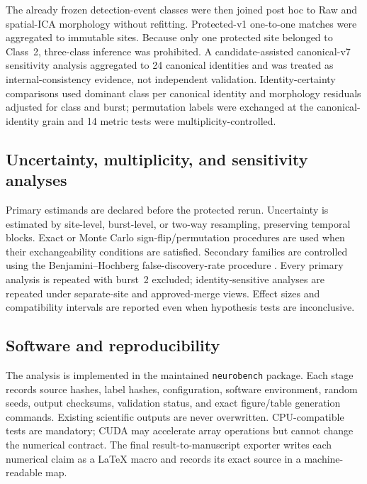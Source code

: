 The already frozen detection-event classes were then joined post hoc to Raw and spatial-ICA morphology without refitting. Protected-v1 one-to-one matches were aggregated to immutable sites. Because only one protected site belonged to Class~2, three-class inference was prohibited. A candidate-assisted canonical-v7 sensitivity analysis aggregated to 24 canonical identities and was treated as internal-consistency evidence, not independent validation. Identity-certainty comparisons used dominant class per canonical identity and morphology residuals adjusted for class and burst; permutation labels were exchanged at the canonical-identity grain and 14 metric tests were multiplicity-controlled.

\subsection{Uncertainty, multiplicity, and sensitivity analyses}

Primary estimands are declared before the protected rerun. Uncertainty is estimated by site-level, burst-level, or two-way resampling, preserving temporal blocks. Exact or Monte Carlo sign-flip/permutation procedures are used when their exchangeability conditions are satisfied. Secondary families are controlled using the Benjamini--Hochberg false-discovery-rate procedure \citep{benjamini1995fdr}. Every primary analysis is repeated with burst~2 excluded; identity-sensitive analyses are repeated under separate-site and approved-merge views. Effect sizes and compatibility intervals are reported even when hypothesis tests are inconclusive.

\subsection{Software and reproducibility}

The analysis is implemented in the maintained \texttt{neurobench} package. Each stage records source hashes, label hashes, configuration, software environment, random seeds, output checksums, validation status, and exact figure/table generation commands. Existing scientific outputs are never overwritten. CPU-compatible tests are mandatory; CUDA may accelerate array operations but cannot change the numerical contract. The final result-to-manuscript exporter writes each numerical claim as a \LaTeX{} macro and records its exact source in a machine-readable map.
